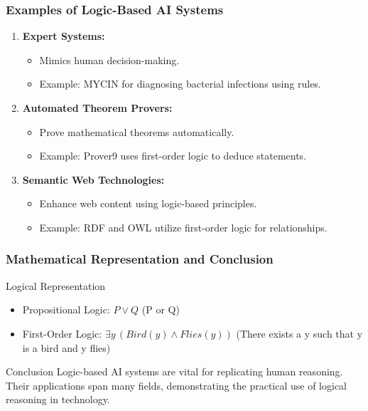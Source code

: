\documentclass[aspectratio=169]{beamer}
\begin{document}
\begin{frame}[fragile]
    \frametitle{Examples of Logic-Based AI Systems}
    \begin{enumerate}
        \item \textbf{Expert Systems:}
        \begin{itemize}
            \item Mimics human decision-making.
            \item Example: MYCIN for diagnosing bacterial infections using rules.
        \end{itemize}
        
        \item \textbf{Automated Theorem Provers:}
        \begin{itemize}
            \item Prove mathematical theorems automatically.
            \item Example: Prover9 uses first-order logic to deduce statements.
        \end{itemize}
        
        \item \textbf{Semantic Web Technologies:}
        \begin{itemize}
            \item Enhance web content using logic-based principles.
            \item Example: RDF and OWL utilize first-order logic for relationships.
        \end{itemize}
    \end{enumerate}
\end{frame}

\begin{frame}[fragile]
    \frametitle{Mathematical Representation and Conclusion}
    \begin{block}{Logical Representation}
        \begin{itemize}
            \item Propositional Logic: \( P \lor Q \) (P or Q)
            \item First-Order Logic: \( \exists y \, (Bird(y) \land Flies(y)) \) (There exists a y such that y is a bird and y flies)
        \end{itemize}
    \end{block}
    
    \begin{block}{Conclusion}
        Logic-based AI systems are vital for replicating human reasoning. Their applications span many fields, demonstrating the practical use of logical reasoning in technology.
    \end{block}
\end{frame}
\end{document}
